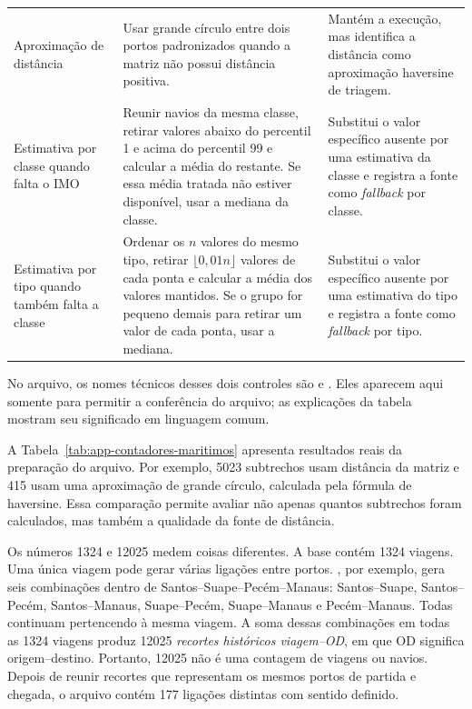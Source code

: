 \begin{table}[htbp]
\begin{tabularx}{\textwidth}{L{0.29\textwidth}L{0.27\textwidth}Y}
Aproximação de distância & Usar grande círculo entre dois portos padronizados quando a matriz não possui distância positiva. & Mantém a execução, mas identifica a distância como aproximação haversine de triagem.\\
Estimativa por classe quando falta o IMO & Reunir navios da mesma classe, retirar valores abaixo do percentil 1 e acima do percentil 99 e calcular a média do restante. Se essa média tratada não estiver disponível, usar a mediana da classe. & Substitui o valor específico ausente por uma estimativa da classe e registra a fonte como \emph{fallback} por classe.\\
Estimativa por tipo quando também falta a classe & Ordenar os \(n\) valores do mesmo tipo, retirar \(\lfloor0{,}01n\rfloor\) valores de cada ponta e calcular a média dos valores mantidos. Se o grupo for pequeno demais para retirar um valor de cada ponta, usar a mediana. & Substitui o valor específico ausente por uma estimativa do tipo e registra a fonte como \emph{fallback} por tipo.\\
\bottomrule
\end{tabularx}
\end{table}

No arquivo, os nomes técnicos desses dois controles são  e . Eles aparecem aqui somente para permitir a conferência do arquivo; as explicações da tabela mostram seu significado em linguagem comum.

A Tabela~\ref{tab:app-contadores-maritimos} apresenta resultados reais da preparação do arquivo. Por exemplo, \num{5023} subtrechos usam distância da matriz e \num{415} usam uma aproximação de grande círculo, calculada pela fórmula de haversine. Essa comparação permite avaliar não apenas quantos subtrechos foram calculados, mas também a qualidade da fonte de distância.

Os números \num{1324} e \num{12025} medem coisas diferentes. A base contém \num{1324} viagens. Uma única viagem pode gerar várias ligações entre portos. , por exemplo, gera seis combinações dentro de Santos--Suape--Pecém--Manaus: Santos--Suape, Santos--Pecém, Santos--Manaus, Suape--Pecém, Suape--Manaus e Pecém--Manaus. Todas continuam pertencendo à mesma viagem. A soma dessas combinações em todas as \num{1324} viagens produz \num{12025} \emph{recortes históricos viagem--OD}, em que OD significa origem--destino. Portanto, \num{12025} não é uma contagem de viagens ou navios. Depois de reunir recortes que representam os mesmos portos de partida e chegada, o arquivo contém \num{177} ligações distintas com sentido definido.

